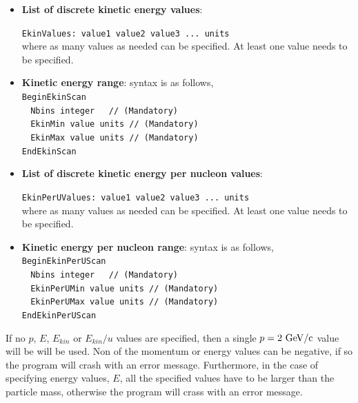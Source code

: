 \begin{itemize}
\begin{itemize}
\begin{itemize}
     \item {\bf List of discrete kinetic energy values}:
     
     \noindent
     {\tt EkinValues: value1  value2  value3 ... units } \\
     \noindent
     where as many values as needed can be specified. At least one value needs to be specified.
     ~\\
     
     \item {\bf Kinetic energy range}: syntax is as follows,
     ~\\
     \noindent     
     {\tt BeginEkinScan} \\
     $~~~~${\tt Nbins   integer $~~$ // (Mandatory)} \\
     $~~~~${\tt EkinMin    value units  // (Mandatory)} \\
     $~~~~${\tt EkinMax    value units  // (Mandatory)} \\
     {\tt EndEkinScan}
     ~\\
     
     \item {\bf List of discrete kinetic energy per nucleon values}:
     
     \noindent
     {\tt EkinPerUValues: value1  value2  value3 ... units } \\
     \noindent
     where as many values as needed can be specified. At least one value needs to be specified.
     ~\\
     
     \item {\bf Kinetic energy per nucleon range}: syntax is as follows,
     ~\\
     \noindent     
     {\tt BeginEkinPerUScan} \\
     $~~~~${\tt Nbins   integer $~~$ // (Mandatory)} \\
     $~~~~${\tt EkinPerUMin    value units  // (Mandatory)} \\
     $~~~~${\tt EkinPerUMax    value units  // (Mandatory)} \\
     {\tt EndEkinPerUScan}
     ~\\
     
   \end{itemize}
   If no $p$, $E$, $E_{kin}$ or $E_{kin}/u$ values are specified, then a single $p = 2~{\rm GeV/c}$ value will be will be used. Non of the momentum or energy values can be negative, if so the program will 
   crash with an error message. Furthermore, in the case of specifying energy values, $E$, all the specified values have to be larger than the particle mass, otherwise the program will crass with an error 
   message.
   ~\\
 

\end{itemize}
\end{itemize}
